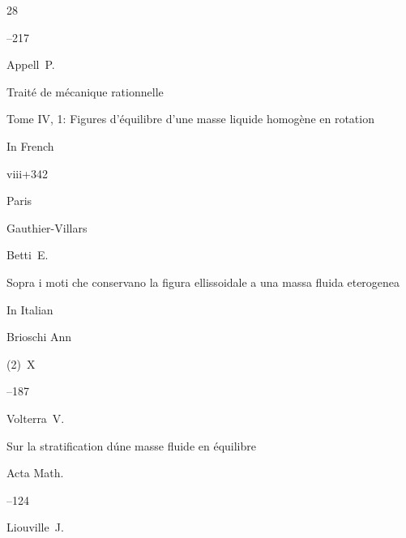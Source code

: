 \begin{thebibliography}{28}



--217






\by Appell~P.

\book Trait\'e de m\'ecanique rationnelle

\bookinfo Tome IV, 1: Figures d'\'equilibre d'une masse liquide homog\`ene en rotation

\lang In French


\totalpages viii+342 

\publaddr  Paris

\publ Gauthier-Villars 









\by Betti~E.

\paper Sopra i moti che conservano la figura ellissoidale a una massa fluida eterogenea

\lang In Italian


\jour Brioschi Ann

\issueinfo  (2)~X

--187









\by Volterra~V.

\paper Sur la stratification d\'une masse fluide en \'equilibre

\jour Acta Math.




--124




\by Liouville~J.


\end{thebibliography}
